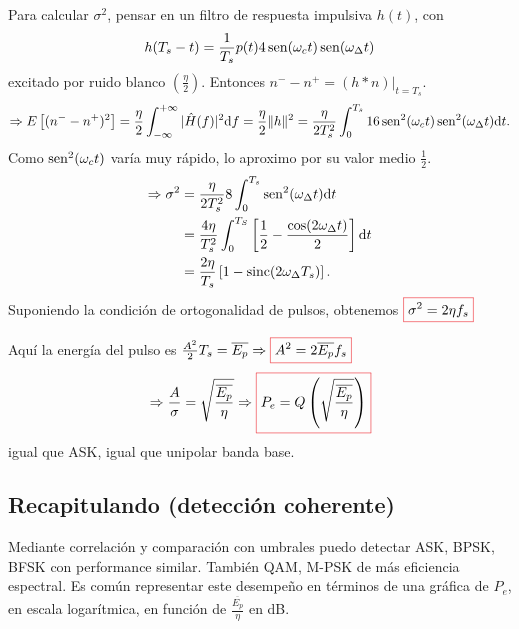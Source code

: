     Para calcular $\sigma^2$, pensar en un filtro de respuesta impulsiva $h(t)$, con
    \[h(T_s-t)=\frac{1}{T_s} p(t) 4 \operatorname{sen}(\omega_c t)\operatorname{sen}(\omega_\Delta t)\]
    excitado por ruido blanco $(\frac{\eta}{2})$.  Entonces $n^- - n^+ = (h\ast
    n)\big|_{t=T_s}$.
    \[\Rightarrow E\left[(n^- - n^+)^2\right] = \frac{\eta}{2} \int_{-\infty}^{+\infty} |\hat{H}(f)|^2 \mathrm{d} f= \frac{\eta}{2} \|h\|^2 = \frac{\eta}{2T_s^2} \int_0^{T_s} 16 \operatorname{sen}^2(\omega_c t)\operatorname{sen}^2(\omega_\Delta t)\mathrm{d} t.\]
    Como $\operatorname{sen}^2(\omega_c t)$ varía muy rápido, lo aproximo por su valor medio
    $\frac{1}{2}$.
    \begin{align*}
        \Rightarrow \sigma^2 &= \frac{\eta}{2T_s^2}8\int_0^{T_s}\operatorname{sen}^2(\omega_\Delta t)\mathrm{d} t\\
        &= \frac{4\eta}{T_s^2} \int_0^{T_S}\left[\frac{1}{2} - \frac{\cos(2\omega_\Delta t)}{2}\right]\mathrm{d} t\\
        &= \frac{2\eta}{T_s} \left[1 - \operatorname{sinc}(2\omega_\Delta
        T_s)\right].
    \end{align*}
    Suponiendo la condición de ortogonalidad de pulsos, obtenemos
    $\col{\sigma^2 = 2\eta f_s}$

    Aquí la energía del pulso es $\frac{A^2}{2} T_s = \overline{E_p} \Rightarrow \col{A^2 = 2\overline{E_p} f_s}$
    \[\Rightarrow \frac{A}{\sigma} = \sqrt{\frac{\overline{E_p}}{\eta}} \Rightarrow \col{P_e=Q\left(\sqrt{\frac{\overline{E_p}}{\eta}}\right)}\]
    igual que ASK, igual que unipolar banda base.


\subsection*{Recapitulando (detección coherente)}

Mediante correlación y comparación con umbrales puedo detectar
ASK, BPSK, BFSK con performance similar. También QAM, M-PSK de más
eficiencia espectral. Es común representar este desempeño en
términos de una gráfica de $P_e$, en escala logarítmica, en
función de $\frac{\overline{E_p}}{\eta}$ en dB.



